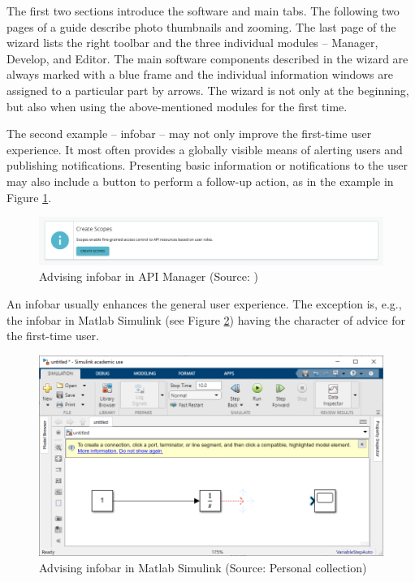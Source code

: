 \documentclass[a4paper,10pt,twoside]{article}
\begin{document}
\newpage
\noindent The first two sections introduce the software and main
tabs. The following two pages of a guide describe photo thumbnails and
zooming. The last page of the wizard lists the right toolbar and the
three individual modules -- Manager, Develop, and Editor. The main
software components described in the wizard are always marked with a
blue frame and the individual information windows are assigned to a
particular part by arrows. The wizard is not only at the beginning,
but also when using the above-mentioned modules for the first time.

The second example -- infobar -- may not only improve the first-time
user experience. It most often provides a globally visible means of
alerting users and publishing notifications. Presenting basic
information or notifications to the user may also include a button to
perform a follow-up action, as in the example in Figure
\ref{fig:info_infobar_1}.

\begin{figure}[hbt!] 
\begin{center}
\includegraphics[width=17cm]{../pictures/info_infobar_1.png} 
\caption[Advising infobar in API Manager]{Advising infobar in API Manager (Source: \cite{githubio})}
\label{fig:info_infobar_1}
\end{center}
\end{figure}

\noindent An infobar usually enhances the general user experience. The
exception is, e.g., the infobar in Matlab Simulink (see Figure
\ref{fig:info_advice_infobar}) having the character of advice for the
first-time user.

\begin{figure}[hbt!] 
\begin{center}
\includegraphics[width=17cm]{../pictures/info_advice_infobar.png} 
\caption[Advising infobar in Matlab Simulink]{Advising  infobar in Matlab Simulink (Source: Personal collection)}
\label{fig:info_advice_infobar}
\end{center}
\end{figure}
\end{document}
